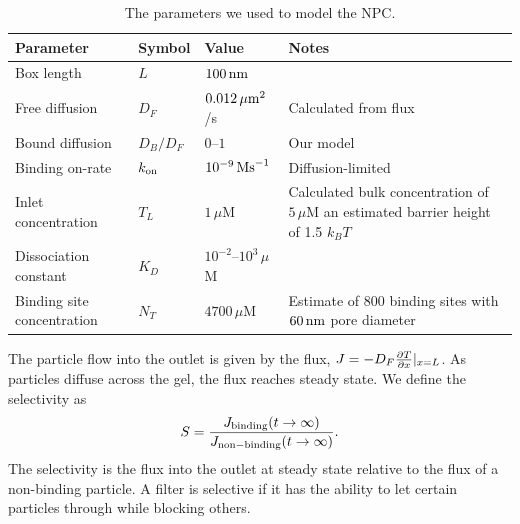 \begin{table}[!b]
  \begin{center}
    \begin{tabular}{p{3.00cm}p{2.0cm}p{3.0cm}p{3.0cm}}
      Parameter & Symbol & Value & Notes\\
      \toprule
      Box length & $L$ & $100 \, {\rm nm} $ 
      &~\cite{frenkiel-krispin_structural_10, maimon_human_12}\\
      Free diffusion  & $D_F$ & $0.012 \,\mu \mathrm{m}^2 $/s
      &Calculated from flux~\cite{ribbeck_kinetic_01}\\
      Bound diffusion  & $D_B/D_F$ &  $0$--$1$
      &Our model~\cite{maguire_design_18}\\
      Binding on-rate  & $k_{\mathrm{on}}$  &  $10^{-9} \, \mathrm{Ms}^{-1}$
      &Diffusion-limited~\cite{milles_plasticity_15, hough_molecular_15}\\
      Inlet concentration  & $T_L$& $ 1 \, \mu$M
      &Calculated bulk concentration of $5 \, \mu$M an 
      estimated barrier height of
      1.5 $k_B T$~\cite{timney_simple_16}  \\
      Dissociation constant  & $K_D$& $ 10^{-2}$--$10^{3}\,\mu$M
      &~\cite{pyhtila_gradient_03, gilchrist_accelerating_02, tetenbaum-novatt_nucleocytoplasmic_12, milles_plasticity_15, timney_simple_16, vovk_simple_16} \\
      Binding site concentration  & $N_T$ & $4700 \,\mu$M
      &Estimate of $800$ binding sites with $60 \, {\rm nm}$ pore diameter 
      \\
    \end{tabular}
  \end{center}
  \caption[NPC parameters]
  {The parameters we used to model the NPC\@.}\label{table:parameters}
\end{table}
%
The particle flow into the outlet is given by the flux, $J = -D_F
\frac{\partial T}{\partial x}|_{x=L}$.  As particles diffuse across the gel, the flux reaches
steady state.  We define the selectivity as 
%
\begin{equation}
  \label{eqn:selectivity}
  S =  \frac{J_{\rm binding}(t \to \infty)}{J_{\rm non-binding}(t \to \infty)}.
\end{equation}
%
The selectivity is the flux into the outlet at steady state relative to the flux
of a non-binding particle.  A filter is selective if it has the ability to let
certain particles through while blocking others. 

